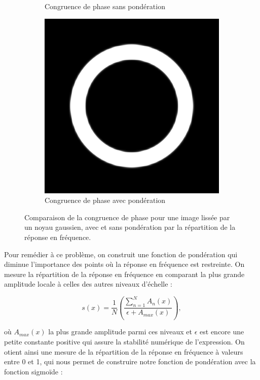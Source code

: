 \begin{figure}
\begin{subfigure}{.22\textwidth}
        \caption{Congruence de phase sans pondération}
    \end{subfigure}
    \begin{subfigure}{.22\textwidth}
        \centering
        \includegraphics[width=\textwidth]{contenu/resources/images/pc_blur_spread}
        \caption{Congruence de phase avec pondération}
    \end{subfigure}

    \caption{Comparaison de la congruence de phase pour une image lissée par un noyau gaussien, avec et sans pondération par la répartition de la réponse en fréquence.}
    \label{fig:phase-congruency-spread}
\end{figure}

Pour remédier à ce problème, on construit une fonction de pondération qui diminue l'importance des points où la réponse en fréquence est restreinte. On mesure la répartition de la réponse en fréquence en comparant la plus grande amplitude locale à celles des autres niveaux d'échelle :

\begin{equation}
    s(x) = \frac1N\left(\frac{\sum_{n=1}^{N}A_n(x)}{\epsilon + A_{max}(x)}\right),
\end{equation}

où $A_{max}(x)$ la plus grande amplitude parmi ces niveaux et $\epsilon$ est encore une petite constante positive qui assure la stabilité numérique de l'expression. On otient ainsi une mesure de la répartition de la réponse en fréquence à valeurs entre 0 et 1, qui nous permet de construire notre fonction de pondération avec la fonction sigmoïde :

